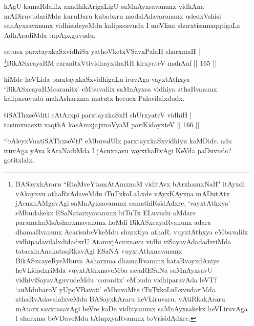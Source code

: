 \begin{artha}
hAgU kamaRdalilx anadhikArigaLigU saMnAyxsavanunx vidhAna mADiruvudariMda kuruDaru kubabxru modalAdavaranunx udedxVshisi sanAyxsavanunx vidhisideyeMdu kalipxsuvudu I meVlina shurxtisamxqqtigaLa AdhAradiMda tapApxguvudu.
\end{artha}



\begin{shl}
satusx parxtayxkaSxvidhiSu yathoVketxVSavxPalaH sharxmaH |\\
\footnote{BASayxkAraru ``EtaMveYtamAtAmxnaM viditAvx bArxhamxNaH" itAyxdi vAkayxvu athaRvAdaveMdu iTuTxkoLaLxde vAyxKAyxna mADutAtx jAcnxnAMgavAgi saMnAyxsavanunx samathiRsidAdxre, `vayxtAthxya' eMbudakekx ESaNatarxyavanunx biTuTx ELuvudu aMdare paramahaMsAsharxmavanunx hoMdi BikASxcayaRvanunx adara dhamaRvanunx AcarisubeVkeMdu shurxtiya athaR. vuyxtAthxya eMbuvalilx vidhipadavilalxdidadxrU AtamxjAcnxnavu vidhi viSayavAdadadxriMda tatasxmAnakataqRkavAgi ESaNA vuyxtAthxnavanunx BikASxcayeRyeMbuva Asharxma dhamaRvanunx kataRvayxdAniye heVLidadxriMda vuyxtAthxnaveMba savaRESaNa saMnAyxsavU vidhiviSayavAguvudeMdu `caranitx' eMbudu vidhiparavAda leVTf `auMdubaroV yUpoVBavati' eMbuvaMte iTuTxkoLuLxvudariMda athaRvAdavalalxveMdu BASayxkAraru heVLiruvaru. vAtiRkakAraru mAtarx savxrasavAgi beVre kaDe vidhiyanunx saMnAyxsakekx heVLiruvAga I sharxma beVDaveMdu tAtapxyaRvanunx toVrisidAdxre.}BikASxcayaRM caranitxVtividhayxthaRH kirxyateV mahAnf \hfill || 165 ||
\end{shl}

\begin{artha}
hiMde heVLida parxtayxkaSxvidhigaLu iruvAga vayxtAthxya  `BikASxcayaRMcaranitx' eMbuvalilx saMnAyxsa vidhiya athaRvanunx kalipxsuvudu mahAsharxma matutx hecucx Palavilalxdudx.
\end{artha}

\begin{shl}
tiSAThxseVditi cAtArxpi parxtayxkaSxH shUrxyateV vidhiH |\\
tasimxnasxti vaqthA kasAmxjajxnoV\s yaM pariKidayxteV \hfill || 166 ||
\end{shl}

\begin{artha}
``bAleyxVnatiSAThxseVtf" eMbuvalUlx parxtayxkaSxvidhiyu kaMDide. adu iruvAga yAva kAraNadiMda I jAcnxnavu vayxthaRvAgi KeVda paDuvudo? gotitxlalx.
\end{artha}

